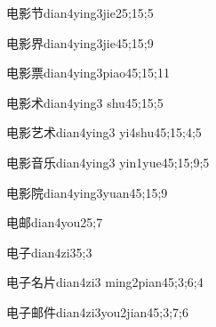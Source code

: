 \begin{verbete}{电影节}{dian4ying3jie2}{5;15;5}
\end{verbete}

\begin{verbete}{电影界}{dian4ying3jie4}{5;15;9}
\end{verbete}

\begin{verbete}{电影票}{dian4ying3piao4}{5;15;11}
\end{verbete}

\begin{verbete}{电影术}{dian4ying3 shu4}{5;15;5}
\end{verbete}

\begin{verbete}{电影艺术}{dian4ying3 yi4shu4}{5;15;4;5}
\end{verbete}

\begin{verbete}{电影音乐}{dian4ying3 yin1yue4}{5;15;9;5}
\end{verbete}

\begin{verbete}{电影院}{dian4ying3yuan4}{5;15;9}
\end{verbete}

\begin{verbete}{电邮}{dian4you2}{5;7}
\end{verbete}

\begin{verbete}{电子}{dian4zi3}{5;3}
\end{verbete}

\begin{verbete}{电子名片}{dian4zi3 ming2pian4}{5;3;6;4}
\end{verbete}

\begin{verbete}{电子邮件}{dian4zi3you2jian4}{5;3;7;6}
\end{verbete}

